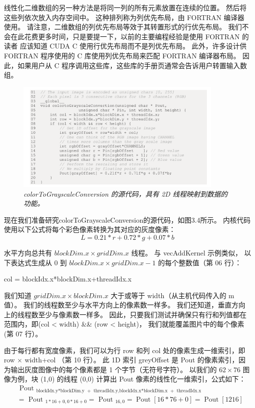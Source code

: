 线性化二维数组的另一种方法是将同一列的所有元素放置在连续的位置。 然后将这些列依次放入内存空间中。 
这种排列称为列优先布局，由 FORTRAN 编译器使用。 请注意，二维数组的列优先布局等效于其转置形式的行优先布局。 
我们不会在此花费更多时间，只是要提一下，以前的主要编程经验是使用 FORTRAN 的读者
应该知道 CUDA C 使用行优先布局而不是列优先布局。 
此外，许多设计供 FORTRAN 程序使用的 C 库使用列优先布局来匹配 FORTRAN 编译器布局。 
因此，如果用户从 C 程序调用这些库，这些库的手册页通常会告诉用户转置输入数组。

\begin{figure}[H]
	\centering
	\includegraphics[width=0.9\textwidth]{figs/F3.4.png}
	\caption{\textit{colorToGrayscaleConversion 的源代码，具有 2D 线程映射到数据的功能。}}
\end{figure}

现在我们准备研究colorToGrayscaleConversion的源代码，如图3.4所示。 
内核代码使用以下公式将每个彩色像素转换为其对应的灰度像素：
$$
L = 0.21*r+0.72*g+0.07*b
$$

水平方向总共有 $blockDim.x \times gridDim.x$ 线程。 与 vecAddKernel 示例类似，
以下表达式生成从 0 到 $blockDim.x \times gridDim.x - 1$ 的每个整数值（第 06 行）：

col = blockIdx.x*blockDim.x+threadIdx.x

我们知道 $gridDim.x \times blockDim.x$ 大于或等于 width（从主机代码传入的 m 值）。 
我们的线程数至少与水平方向上的像素数一样多。 我们还知道，垂直方向上的线程数至少与像素数一样多。 
因此，只要我们测试并确保只有行和列值都在范围内，即(col < width) \&\& (row < height)，
我们就能覆盖图片中的每个像素(第 07 行）。

由于每行都有宽度像素，我们可以为行 row 和列 col 处的像素生成一维索引，即 row × width+col （第 10 行）。 
此 1D 索引 greyOffset 是 Pout 的像素索引，因为输出灰度图像中的每个像素都是 1 个字节（无符号字符）。 
以我们的 $62 \times 76$ 图像为例，块 (1,0) 的线程 (0,0) 计算出 Pout 像素的线性化一维索引，公式如下：
$$
\begin{aligned}
& \text { Pout }_{\text {blockIdx.y*blockDim.y }+ \text { threadIdx.y,blockIdx.x*blockDim.x }+ \text { threadIdx.x }} \\
& =\text { Pout }_{1 * 16+0,0 * 16+0}=\text { Pout }_{16,0}=\operatorname{Pout}[16 * 76+0]=\operatorname{Pout}[1216]
\end{aligned}
$$

